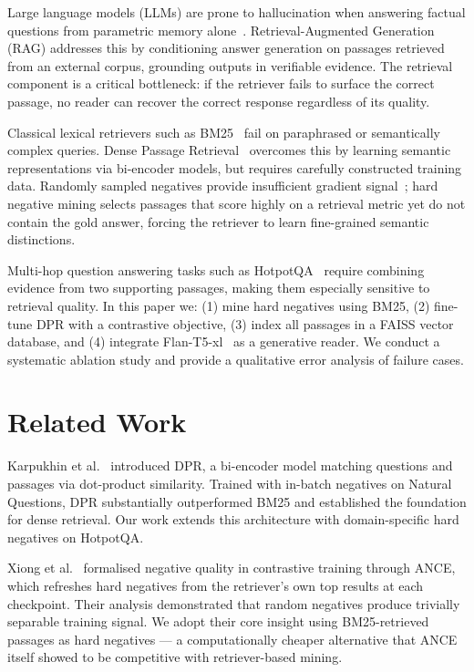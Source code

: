 \documentclass{llncs}
\begin{document}
Large language models (LLMs) are prone to hallucination when answering
factual questions from parametric memory alone~\cite{lewis2020rag}.
Retrieval-Augmented Generation (RAG) addresses this by conditioning answer
generation on passages retrieved from an external corpus, grounding outputs
in verifiable evidence. The retrieval component is a critical bottleneck:
if the retriever fails to surface the correct passage, no reader can
recover the correct response regardless of its quality.

Classical lexical retrievers such as BM25~\cite{robertson2009bm25} fail on
paraphrased or semantically complex queries. Dense Passage
Retrieval~\cite{karpukhin2020dpr} overcomes this by learning semantic
representations via bi-encoder models, but requires carefully constructed
training data. Randomly sampled negatives provide insufficient gradient
signal~\cite{xiong2021ance}; hard negative mining selects passages that
score highly on a retrieval metric yet do not contain the gold answer,
forcing the retriever to learn fine-grained semantic distinctions.

Multi-hop question answering tasks such as HotpotQA~\cite{yang2018hotpotqa}
require combining evidence from two supporting passages, making them
especially sensitive to retrieval quality. In this paper we: (1) mine hard
negatives using BM25, (2) fine-tune DPR with a contrastive objective, (3)
index all passages in a FAISS vector database, and (4) integrate
Flan-T5-xl~\cite{chung2022flant5} as a generative reader. We conduct a
systematic ablation study and provide a qualitative error analysis of
failure cases.

\section{Related Work}

Karpukhin et al.~\cite{karpukhin2020dpr} introduced DPR, a bi-encoder
model matching questions and passages via dot-product similarity. Trained
with in-batch negatives on Natural Questions, DPR substantially outperformed
BM25 and established the foundation for dense retrieval. Our work extends
this architecture with domain-specific hard negatives on HotpotQA.

Xiong et al.~\cite{xiong2021ance} formalised negative quality in contrastive
training through ANCE, which refreshes hard negatives from the retriever's
own top results at each checkpoint. Their analysis demonstrated that random
negatives produce trivially separable training signal. We adopt their core
insight using BM25-retrieved passages as hard negatives --- a computationally
cheaper alternative that ANCE itself showed to be competitive with
retriever-based mining.
\end{document}
